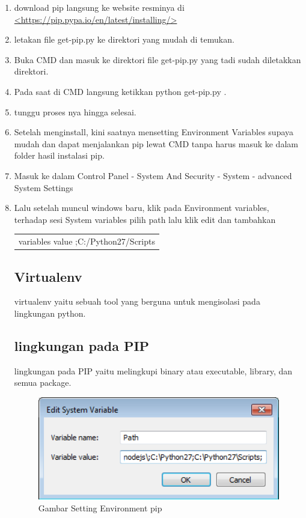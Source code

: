 		\begin{enumerate}
			\item download pip langsung ke website resminya di \url{<https://pip.pypa.io/en/latest/installing/>}
			\item letakan file get-pip.py ke direktori yang mudah di temukan.
			\item Buka CMD dan masuk ke direktori file get-pip.py yang tadi sudah diletakkan direktori.
			\item Pada saat di CMD langsung ketikkan python get-pip.py .
			\item tunggu proses nya hingga selesai.
			\item Setelah menginstall, kini saatnya mensetting Environment Variables supaya mudah dan dapat menjalankan pip lewat CMD tanpa harus masuk ke dalam folder hasil instalasi pip.
			\item Masuk ke dalam Control Panel - System And Security - System - advanced System Settings
			\item Lalu setelah muncul windows baru, klik pada Environment variables, terhadap sesi System variables pilih path lalu klik edit dan tambahkan
				\begin{table}[H]
					\begin{tabular}{|c|}
						\hline
						variables value ;C:/Python27/Scripts\\
					\end{tabular}
				\end{table}
				
	\subsection{Virtualenv}
	virtualenv yaitu sebuah tool yang berguna untuk mengisolasi pada lingkungan python.
	
	\subsection{lingkungan pada PIP}
	lingkungan pada PIP yaitu melingkupi binary atau executable, library, dan semua package.
				  
	\begin{figure} [ht]
		\centerline{\includegraphics[width=1\textwidth]{figures/setting-env.png}}
		\caption{Gambar Setting Environment pip}
		\label{setting-env}
	\end{figure}
	

\end{enumerate}
